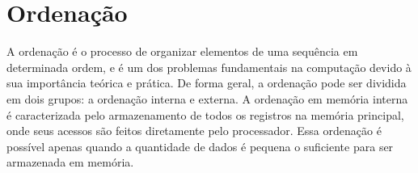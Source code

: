 \section{Ordenação}


%
%
%
%
%
%

A ordenação é o processo de organizar elementos de uma sequência em determinada ordem, e é um dos problemas fundamentais na computação devido à sua importância teórica e prática. De forma geral, a ordenação pode ser dividida em dois grupos: a ordenação interna e externa. 
A ordenação em memória interna é caracterizada pelo armazenamento de todos os registros na memória principal, onde seus acessos são feitos diretamente pelo processador. Essa ordenação é possível apenas quando a quantidade de dados é pequena o suficiente para ser armazenada em memória. 

